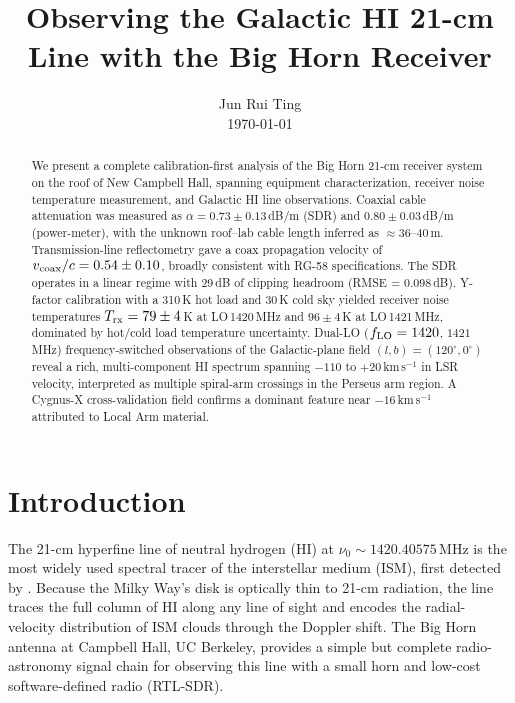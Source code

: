 \documentclass[10pt,preprint2]{aastex}
\begin{document}
\title{Observing the Galactic HI 21-cm Line with the Big Horn Receiver}
\author{Jun Rui Ting \\ \today\vspace{-2.5\baselineskip}}

\begin{abstract}
We present a complete calibration-first analysis of the Big Horn
21-cm receiver system on the roof of New Campbell Hall, spanning equipment characterization, receiver noise temperature
measurement, and Galactic HI line observations.
Coaxial cable attenuation was measured as $\alpha = 0.73 \pm 0.13$\,dB/m
(SDR) and $0.80 \pm 0.03$\,dB/m (power-meter),
with the unknown roof--lab cable length inferred as $\approx 36$--$40$\,m.
Transmission-line reflectometry gave a coax propagation velocity of
$v_{\rm coax}/c = 0.54 \pm 0.10$, broadly consistent with RG-58 specifications.
The SDR operates in a linear regime with 29\,dB of clipping headroom (RMSE = 0.098\,dB).
Y-factor calibration with a 310\,K hot load and 30\,K cold sky yielded
receiver noise temperatures $T_{\rm rx} = 79 \pm 4$\,K at LO\,1420\,MHz
and $96 \pm 4$\,K at LO\,1421\,MHz, dominated by hot/cold load temperature uncertainty.
Dual-LO ($f_{\rm LO} = 1420$, $1421$\,MHz) frequency-switched observations of
the Galactic-plane field $(l,b) = (120^\circ, 0^\circ)$ reveal a rich, multi-component
HI spectrum spanning $-110$ to $+20$\,km\,s$^{-1}$ in LSR velocity,
interpreted as multiple spiral-arm crossings in the Perseus arm region.
A Cygnus-X cross-validation field confirms a dominant feature near
$-16$\,km\,s$^{-1}$ attributed to Local Arm material.

\vspace{2.5\baselineskip}
\end{abstract}


\section{Introduction}
\label{sec:intro}

The 21-cm hyperfine line of neutral hydrogen (HI) at $\nu_0 \sim 1420.40575$\,MHz
is the most widely used spectral tracer of the interstellar medium (ISM),
first detected by \citet{ewen1951}.
Because the Milky Way's disk is optically thin to 21-cm radiation,
the line traces the full column of HI along any line of sight and
encodes the radial-velocity distribution of ISM clouds through the
Doppler shift.
The Big Horn antenna at Campbell Hall, UC Berkeley, provides a simple
but complete radio-astronomy signal chain for observing this line with
a small horn and low-cost software-defined radio (RTL-SDR).
\end{document}
